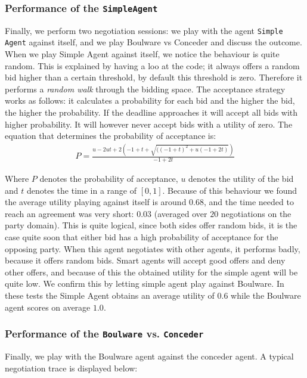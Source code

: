 \documentclass[a4paper,10pt]{article}
\begin{document}
\clearpage

\subsubsection{Performance of the \texttt{SimpleAgent}}

Finally, we perform two negotiation sessions: we play with the agent \texttt{Simple Agent} against itself, and we play Boulware vs Conceder and discuss the outcome. When we play Simple Agent against itself, we notice the behaviour is quite random. This is explained by having a loo at the code; it always offers a random bid higher than a certain threshold,
by default this threshold is zero. Therefore it performs a \emph{random walk} through the 
bidding space. The acceptance strategy works as follows: it calculates a probability for each bid and the higher the bid, the higher the probability. If the deadline approaches it will accept all bids with higher probability. It will however never accept bids with a utility of zero. The equation that determines the probability of acceptance is:
\begin{align}
P = \frac{u - 2ut + 2(-1 + t + \sqrt{((-1 + t)^2 + u(-1 + 2t)})}{-1 + 2t}
\end{align}

Where $P$ denotes the probability of acceptance, $u$ denotes the utility of the bid and $t$ denotes the time in a range of $[0, 1]$. Because of this behaviour we found the average utility playing against itself is around $0.68$, and the time needed to reach an agreement was very short: $0.03$ (averaged over $20$ negotiations on the party domain).
This is quite logical, since both sides offer random bids, it is the
case quite soon that either bid has a high probability of acceptance for the opposing party. When this agent negotiates with other agents, it performs badly, because
it offers random bids. Smart agents will accept good offers and deny other offers,
and because of this the obtained utility for the simple agent will be quite low.
We confirm this by letting simple agent play against Boulware. In these tests the Simple Agent obtains an average utility of $0.6$ while the Boulware agent scores on average $1.0$. 

\subsubsection{Performance of the \texttt{Boulware} vs. \texttt{Conceder}}
Finally, we play with the Boulware agent against the conceder agent. A typical negotiation trace is displayed below: \\
\end{document}
